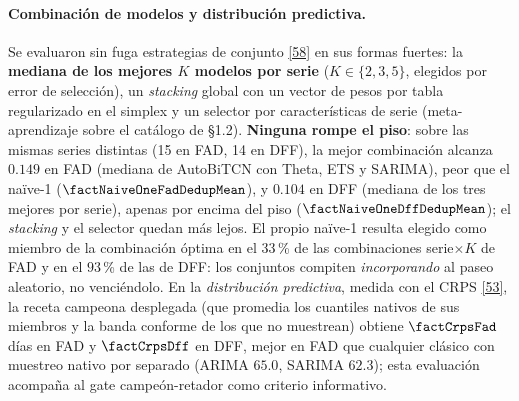 \documentclass[12pt,letterpaper]{report}
\newcommand{\cita}[1]{\hyperref[bib:#1]{[#1]}}
\begin{document}
\paragraph{Combinación de modelos y distribución predictiva.} Se evaluaron sin fuga estrategias
de conjunto \cita{58} en sus formas fuertes: la \textbf{mediana de los mejores $K$ modelos por
serie} ($K\in\{2,3,5\}$, elegidos por error de selección), un \textit{stacking} global con un
vector de pesos por tabla regularizado en el simplex y un selector por características de serie
(meta-aprendizaje sobre el catálogo de §1.2). \textbf{Ninguna rompe el piso}: sobre las mismas
series distintas (15 en FAD, 14 en DFF), la mejor combinación alcanza $0.149$ en FAD (mediana de
AutoBiTCN con Theta, ETS y SARIMA), peor que el naïve-1 ($\factNaiveOneFadDedupMean$), y $0.104$
en DFF (mediana de los tres mejores por serie), apenas por encima del piso
($\factNaiveOneDffDedupMean$); el \textit{stacking} y el selector quedan más lejos. El propio
naïve-1 resulta elegido como miembro de la combinación óptima en el $33$\,\% de las
combinaciones serie$\times K$ de FAD y en el $93$\,\% de las de DFF: los conjuntos compiten
\textit{incorporando} al paseo aleatorio, no venciéndolo. En la \textit{distribución
predictiva}, medida con el CRPS \cita{53}, la
receta campeona desplegada (que promedia los cuantiles nativos de sus miembros y la banda
conforme de los que no muestrean) obtiene $\factCrpsFad$ días en FAD y $\factCrpsDff$ en DFF,
mejor en FAD que cualquier clásico con muestreo nativo por separado (ARIMA $65.0$, SARIMA
$62.3$); esta evaluación acompaña al gate campeón-retador como criterio informativo.
\end{document}
